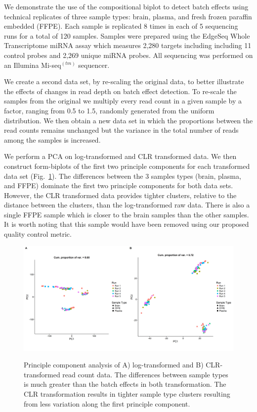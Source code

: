 \documentclass [10pt]{article}
\theoremstyle{definition}
\begin{document}

We demonstrate the use of the compositional biplot to detect batch effects using technical replicates of three sample types: brain, plasma, and fresh frozen paraffin embedded (FFPE).  Each sample is replicated 8 times in each of 5 sequencing runs for a total of 120 samples.  Samples were prepared using the EdgeSeq Whole Transcriptome miRNA assay which measures 2,280 targets including including 11 control probes and 2,269 unique miRNA probes.  All sequencing was performed on an Illumina Mi-seq$^{(tm)}$ sequencer.

We create a second data set, by re-scaling the original data, to better illustrate the effects of changes in read depth on batch effect detection.  To re-scale the samples from the original we multiply every read count in a given sample by a factor, ranging from 0.5 to 1.5, randomly generated from the uniform distribution.  We then obtain a new data set in which the proportions between the read counts remains unchanged but the variance in the total number of reads among the samples is increased.


We perform a PCA on log-transformed and CLR transformed data.  We then construct form-biplots of the first two principle components for each transformed data set (Fig.~\ref{rawPCA}).  The differences between the 3 samples types (brain, plasma, and FFPE) dominate the first two principle components for both data sets.  However, the CLR transformed data provides tighter clusters, relative to the distance between the clusters, than the log-transformed raw data.  There is also a single FFPE sample which is closer to the brain samples than the other samples.  It is worth noting that this sample would have been removed using our proposed quality control metric.

\begin{figure}
\includegraphics[scale=0.4]{./Figures/IO_PCA_2plot}
\label{rawPCA}
\caption{Principle component analysis of A) log-transformed and B) CLR-transformed read count data.  The differences between sample types is much greater than the batch effects in both transformation.  The CLR transformation results in tighter sample type clusters resulting from less variation along the first principle component. }
\end{figure}
\end{document}
